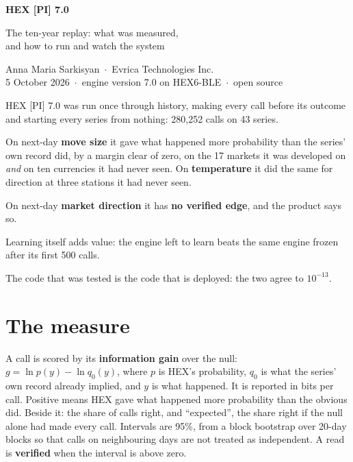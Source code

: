 \documentclass[10.5pt]{article}
\begin{document}
\begin{center}
{\LARGE\bfseries\color{ink} HEX [PI] 7.0\par}\vspace{4pt}
{\Large\color{ink} The ten-year replay: what was measured,\\ and how to run and watch the system\par}
\vspace{8pt}
Anna Maria Sarkisyan \,$\cdot$\, Evrica Technologies Inc.\\
5 October 2026 \,$\cdot$\, engine version 7.0 on HEX6-BLE \,$\cdot$\, open source
\end{center}

\begin{plain}
HEX [PI] 7.0 was run once through history, making every call before its outcome and starting every series from nothing: 280,252 calls on 43 series.

On next-day \textbf{move size} it gave what happened more probability than the series' own record did, by a margin clear of zero, on the 17 markets it was developed on \emph{and} on ten currencies it had never seen. On \textbf{temperature} it did the same for direction at three stations it had never seen.

On next-day \textbf{market direction} it has \textbf{no verified edge}, and the product says so.

Learning itself adds value: the engine left to learn beats the same engine frozen after its first 500 calls.

The code that was tested is the code that is deployed: the two agree to $10^{-13}$.
\end{plain}

\section{The measure}
A call is scored by its \textbf{information gain} over the null: $g=\ln p(y)-\ln q_0(y)$, where $p$ is HEX's probability, $q_0$ is what the series' own record already implied, and $y$ is what happened. It is reported in bits per call. Positive means HEX gave what happened more probability than the obvious did. Beside it: the share of calls right, and ``expected'', the share right if the null alone had made every call. Intervals are 95\%, from a block bootstrap over 20-day blocks so that calls on neighbouring days are not treated as independent. A read is \textbf{verified} when the interval is above zero.
\end{document}
